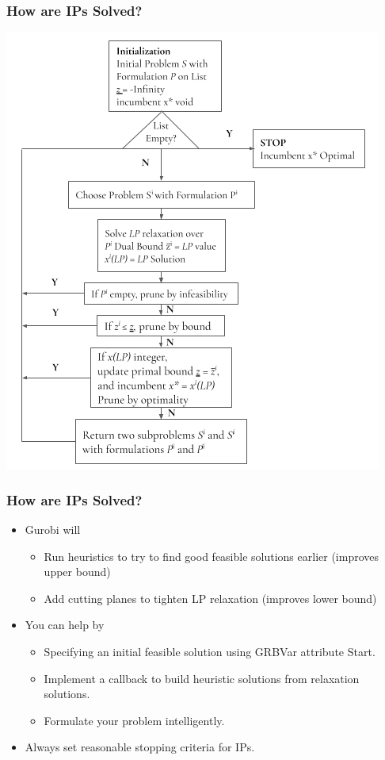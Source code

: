 \documentclass[12pt,handout]{beamer}
\begin{document}
\begin{frame}
\frametitle{How are IPs Solved?}
\begin{center}
\includegraphics[scale=0.4]{flowchart.png}
\end{center}
\end{frame}

\begin{frame}
\frametitle{How are IPs Solved?}
\begin{itemize}
\item Gurobi will
    \begin{itemize}
    \item Run heuristics to try to find good feasible solutions earlier (improves upper bound)
    \item Add cutting planes to tighten LP relaxation (improves lower bound)
    \end{itemize}
\item You can help by
    \begin{itemize}
    \item Specifying an initial feasible solution using GRBVar attribute Start.
    \item Implement a callback to build heuristic solutions from relaxation solutions.
    \item Formulate your problem intelligently.
    \end{itemize}
\item Always set reasonable stopping criteria for IPs.
\end{itemize}
\end{frame}
\end{document}
